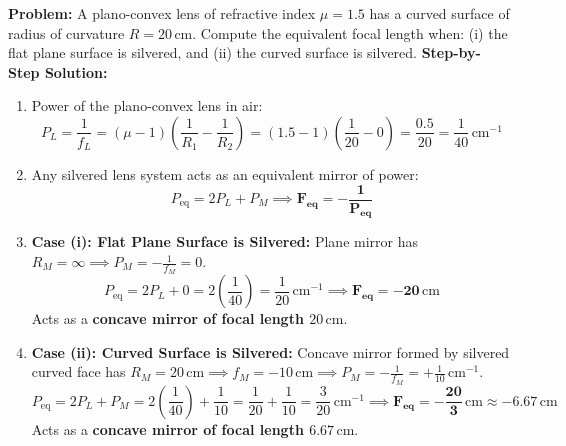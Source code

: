 \documentclass[10pt,a4paper]{article}
\begin{document}
\begin{usecasebox}
\textbf{Problem:} A plano-convex lens of refractive index $\mu = 1.5$ has a curved surface of radius of curvature $R = 20\,\mathrm{cm}$. Compute the equivalent focal length when: (i) the flat plane surface is silvered, and (ii) the curved surface is silvered.
\textbf{Step-by-Step Solution:}
\begin{enumerate}
  \item Power of the plano-convex lens in air:
  \begin{equation}
    P_L = \frac{1}{f_L} = (\mu - 1)\left(\frac{1}{R_1} - \frac{1}{R_2}\right) = (1.5 - 1)\left(\frac{1}{20} - 0\right) = \frac{0.5}{20} = \frac{1}{40}\,\mathrm{cm}^{-1}
  \end{equation}
  \item Any silvered lens system acts as an equivalent mirror of power:
  \begin{equation}
    P_{\text{eq}} = 2 P_L + P_M \implies \mathbf{F_{\text{eq}} = -\frac{1}{P_{\text{eq}}}}
  \end{equation}
  \item \textbf{Case (i): Flat Plane Surface is Silvered:}
  Plane mirror has $R_M = \infty \implies P_M = -\frac{1}{f_M} = 0$.
  \begin{equation}
    P_{\text{eq}} = 2 P_L + 0 = 2 \left(\frac{1}{40}\right) = \frac{1}{20}\,\mathrm{cm}^{-1} \implies \mathbf{F_{\text{eq}} = -20\,\mathrm{cm}}
  \end{equation}
  Acts as a \textbf{concave mirror of focal length $20\,\mathrm{cm}$}.
  \item \textbf{Case (ii): Curved Surface is Silvered:}
  Concave mirror formed by silvered curved face has $R_M = 20\,\mathrm{cm} \implies f_M = -10\,\mathrm{cm} \implies P_M = -\frac{1}{f_M} = +\frac{1}{10}\,\mathrm{cm}^{-1}$.
  \begin{equation}
    P_{\text{eq}} = 2 P_L + P_M = 2 \left(\frac{1}{40}\right) + \frac{1}{10} = \frac{1}{20} + \frac{1}{10} = \frac{3}{20}\,\mathrm{cm}^{-1} \implies \mathbf{F_{\text{eq}} = -\frac{20}{3}\,\mathrm{cm} \approx -6.67\,\mathrm{cm}}
  \end{equation}
  Acts as a \textbf{concave mirror of focal length $6.67\,\mathrm{cm}$}.
\end{enumerate}
\end{usecasebox}
\end{document}
